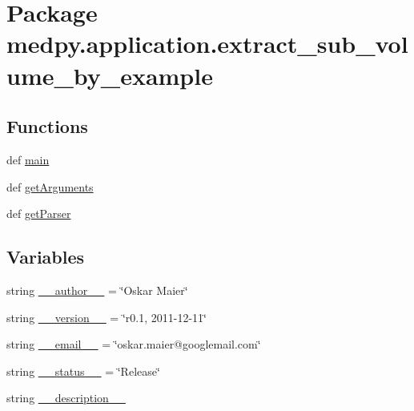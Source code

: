 \hypertarget{namespacemedpy_1_1application_1_1extract__sub__volume__by__example}{
\section{Package medpy.application.extract\_\-sub\_\-volume\_\-by\_\-example}
\label{namespacemedpy_1_1application_1_1extract__sub__volume__by__example}
}
\subsection*{Functions}
\begin{DoxyCompactItemize}
\item 
def \hyperlink{namespacemedpy_1_1application_1_1extract__sub__volume__by__example_ac8287a3a3d3ca5b18556ae102282d4f0}{main}
\item 
def \hyperlink{namespacemedpy_1_1application_1_1extract__sub__volume__by__example_a49a1a9925d309e3464de22b3a25a98aa}{getArguments}
\item 
def \hyperlink{namespacemedpy_1_1application_1_1extract__sub__volume__by__example_a7a8b6f8b0ec0bad4c7adbd5cb1fbc2bc}{getParser}
\end{DoxyCompactItemize}
\subsection*{Variables}
\begin{DoxyCompactItemize}
\item 
string \hyperlink{namespacemedpy_1_1application_1_1extract__sub__volume__by__example_a13cda8675e996c30af3c95a6bd522cf3}{\_\-\_\-author\_\-\_\-} = \char`\"{}Oskar Maier\char`\"{}
\item 
string \hyperlink{namespacemedpy_1_1application_1_1extract__sub__volume__by__example_af1ac94064e9c2da48f42912d6a55f0e7}{\_\-\_\-version\_\-\_\-} = \char`\"{}r0.1, 2011-\/12-\/11\char`\"{}
\item 
string \hyperlink{namespacemedpy_1_1application_1_1extract__sub__volume__by__example_a08489272bb0386917806195c898c0a6f}{\_\-\_\-email\_\-\_\-} = \char`\"{}oskar.maier@googlemail.com\char`\"{}
\item 
string \hyperlink{namespacemedpy_1_1application_1_1extract__sub__volume__by__example_a9b87631413f2441b40f8c2e7a8571f19}{\_\-\_\-status\_\-\_\-} = \char`\"{}Release\char`\"{}
\item 
string \hyperlink{namespacemedpy_1_1application_1_1extract__sub__volume__by__example_ad638c24ee2f6e1190596c7a4694b5f30}{\_\-\_\-description\_\-\_\-}
\end{DoxyCompactItemize}


